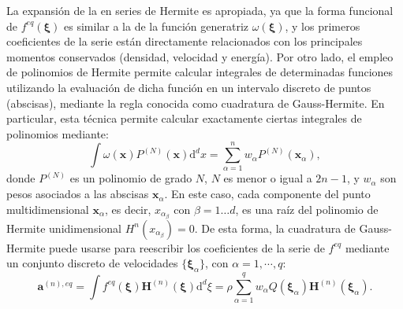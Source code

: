 La expansi\'on de la \edf{} \feqvar{} en series de Hermite es apropiada, ya que la forma funcional de $f^{eq}(\bm{\xi})$ es similar a la de la funci\'on generatriz $\omega(\bm{\xi})$, y los primeros coeficientes de la serie est\'an directamente relacionados con los principales momentos conservados (densidad, velocidad y energ\'ia). Por otro lado, el empleo de polinomios de Hermite permite calcular integrales de determinadas funciones utilizando la evaluaci\'on de dicha funci\'on en un intervalo discreto de puntos (abscisas), mediante la regla conocida como cuadratura de Gauss-Hermite. En particular, esta t\'ecnica permite calcular exactamente ciertas integrales de polinomios mediante:
\begin{equation}
	\int \omega(\bm{x}) P^{(N)}(\bm{x})\mbox{d}^dx = \sum_{\alpha=1}^{n} w_{\alpha} P^{(N)}(\bm{x}_{\alpha}),
\end{equation}
donde $P^{(N)}$ es un polinomio de grado $N$, $N$ es menor o igual a $2n-1$, y $w_{\alpha}$ son pesos asociados a las abscisas $\bm{x}_{\alpha}$. En este caso, cada componente del punto multidimensional $\bm{x}_{\alpha}$, es decir, $x_{\alpha_{\beta}}$ con $\beta=1\ldots d$, es una ra\'iz del polinomio de Hermite unidimensional $H^{n}(x_{\alpha _{\beta}})=0$. De esta forma, la cuadratura de Gauss-Hermite puede usarse para reescribir los coeficientes de la serie de $f^{eq}$ mediante un conjunto discreto de velocidades $\{ \bm{\xi}_{\alpha} \}$, con $\alpha=1, \cdots ,q$:
\begin{equation}
	\bm{a}^{(n),eq} = \int f^{eq}(\bm{\xi}) \bm{H}^{(n)}(\bm{\xi}) \mbox{d}^d \xi 
	= \rho \sum_{\alpha=1}^q w_{\alpha} Q(\bm{\xi}_{\alpha})\bm{H}^{(n)}(\bm{\xi}_{\alpha}).
\end{equation}

